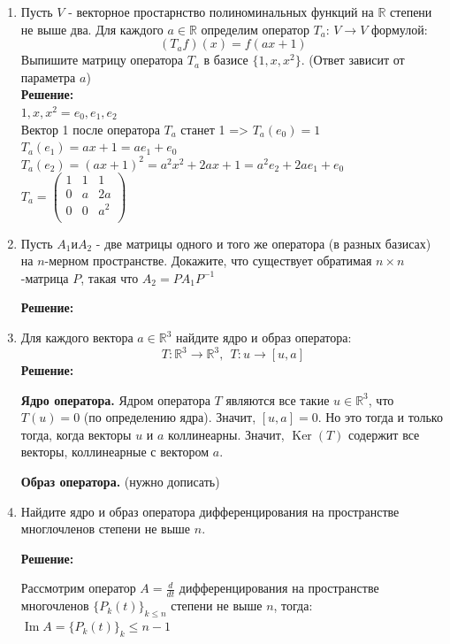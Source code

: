 \documentclass[]{book}
\theoremstyle{definition}
\newcommand{\bb}[1]{\mathbb{#1}}
\newcommand{\R}{\bb{R}}
\renewcommand{\leq}{\leqslant}
\DeclareMathOperator{\Ima}{Im}
\DeclareMathOperator{\Ker}{Ker}
\begin{document}
\begin{enumerate}[resume]

\item Пусть $V$ - векторное простарнство полиноминальных функций на $\bb{R}$ степени не выше два. Для каждого $a \in \bb{R}$ определим оператор $T_a$: $V \rightarrow V$ формулой:
$$(T_a f)(x) = f(ax+1)$$
Выпишите матрицу оператора $T_a$ в базисе $\{1, x, x^2\}$. (Ответ зависит от параметра $a$)\\
\textbf{Решение:}
\\ ${1, x, x^2} = {e_0, e_1, e_2}$\\
Вектор 1 после оператора $T_a$ станет 1 => $T_a(e_0) = 1$\\
$T_a(e_1) = ax + 1 = ae_1 + e_0$\\
$T_a(e_2) = (ax + 1)^2 = a^2x^2 + 2ax + 1 = a^2e_2 + 2ae_1 + e_0$\\
$T_a = 
\begin{pmatrix}
1 & 1 & 1 \\
0 & a & 2a \\
0 & 0 & a^2 \\
\end{pmatrix}$


\item Пусть $A_1 и A_2$ -  две матрицы одного и того же оператора (в разных базисах) на $n$-мерном пространстве. Докажите, что существует обратимая $n\times n$-матрица $P$, такая что $A_2=PA_1P^{-1}$

\textbf{Решение:}



\item Для каждого вектора $a \in \bb{R}^3$ найдите ядро и образ оператора:
$$T:\bb{R}^3 \rightarrow \bb{R}^3, \ \ T: u \rightarrow [u,a]$$
\textbf{Решение:}

\textbf{Ядро оператора.} Ядром оператора $T$ являются все такие $u \in \R^3$, что $T(u) = 0$ (по определению ядра). Значит,  $[u,a] = 0$. Но это тогда и только тогда, когда векторы $u$ и $a$ коллинеарны. Значит, $\Ker(T)$ содержит все векторы, коллинеарные с вектором $a$.

\textbf{Образ оператора.} (нужно дописать) 

\item Найдите ядро и образ оператора дифференцирования на пространстве многлочленов степени не выше $n$.

\textbf{Решение:}

Рассмотрим оператор $A = \frac{d}{dt}$ дифференцирования на пространстве многочленов $\{P_k(t) \}_{k \leq n}$ степени не выше $n$, тогда:
$\Ima A = \{ P_k(t) \}_k \leq n - 1$


\end{enumerate}
\end{document}
